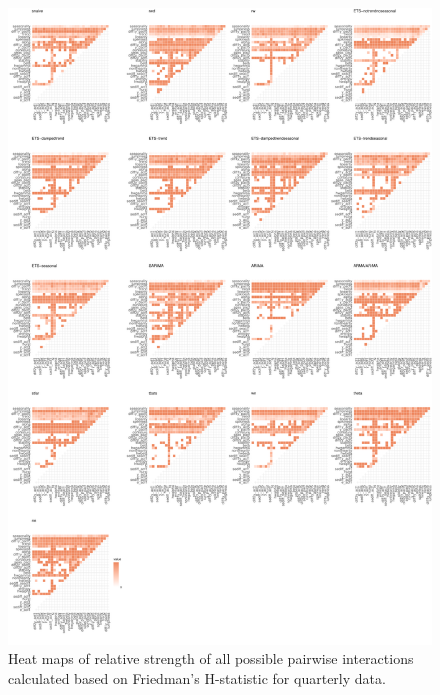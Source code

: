 \documentclass[11pt,a4paper,]{article}
\begin{document}
\begin{figure}
\centering
\includegraphics{figures/friedmanQ-1.pdf}
\caption{\label{fig:friedmanQ}Heat maps of relative strength of all possible
pairwise interactions calculated based on Friedman's H-statistic for
quarterly data.}
\end{figure}

\newpage
\end{document}
